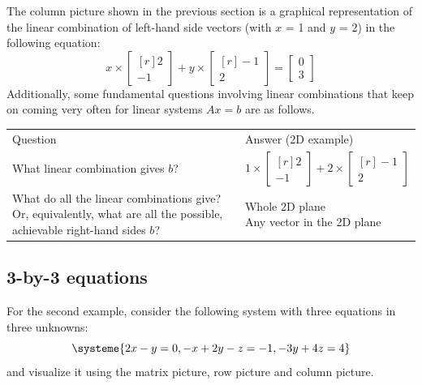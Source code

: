 \documentclass[../main.tex]{subfiles}
\begin{document}
The column picture shown in the previous section is a graphical representation of the linear combination of left-hand side vectors (with $x$ = 1 and $y$ = 2) in the following equation:
\[
    x \times
    \begin{bmatrix*}[r]
        2 \\
        -1
    \end{bmatrix*}
    +
    y \times
    \begin{bmatrix*}[r]
        -1 \\
        2
    \end{bmatrix*}
    =
    \begin{bmatrix*}
        0 \\
        3
    \end{bmatrix*}
\]
Additionally, some fundamental questions involving linear combinations that keep on coming very often for linear systems $Ax = b$ are as follows.
\begin{tabular}{@{}ll@{}} \trule
    \textrm{Question}                  & \textrm{Answer (2D example)} \\ \mrule
    What linear combination gives $b$? &
    $
        1 \times
        \begin{bmatrix*}[r]
            2 \\
            -1
        \end{bmatrix*}
        +
        2 \times
        \begin{bmatrix*}[r]
            -1 \\
            2
        \end{bmatrix*}
    $                                                                 \\
    \makecell[tl]{What do all the linear combinations give?           \\[2pt] Or, equivalently, what are all the possible, \\ achievable right-hand sides $b$?} & \makecell[tl]{Whole 2D plane \\[2pt] Any vector in the 2D plane}
\end{tabular}

\subsection{3-by-3 equations}
For the second example, consider the following system with three equations in three unknowns:
\[
    \systeme{2x - y = 0, -x + 2y - z = -1, -3y + 4z = 4}
\]
and visualize it using the matrix picture, row picture and column picture.
\end{document}
